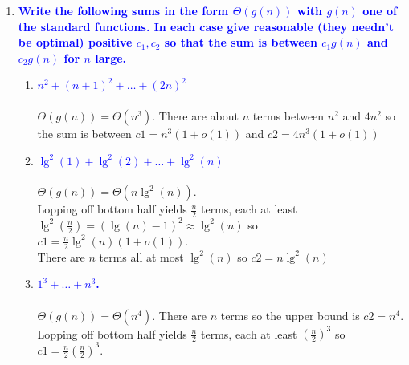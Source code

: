 \documentclass[11pt]{article}
\begin{document}
\begin{enumerate}
\item \textbf{\textcolor{blue}{Write the following sums in the form $\Theta(g(n))$ with $g(n)$
one of the standard functions.  
In each case give reasonable (they
needn't be optimal) positive $c_1,c_2$ so that the sum is between
$c_1g(n)$ and $c_2g(n)$ for $n$ large.}}
    \begin{enumerate}
    \item \textbf{\textcolor{blue}{$n^2+(n+1)^2+\ldots + (2n)^2$}}
        \\\\ $\Theta(g(n)) = \Theta(n^3)$. There are about $n$ terms between $n^2$ and $4n^2$ so the sum is between $c1 = n^3(1+o(1))$ and $c2 = 4n^3(1+o(1))$ \\
    \item \textbf{\textcolor{blue}{$\lg^2(1)+\lg^2(2)+\ldots + \lg^2(n)$}}
        \\\\ $\Theta(g(n)) = \Theta(n\lg^2(n))$.
        \\ Lopping off bottom half yields $\frac{n}{2}$ terms, each at least $\lg^2(\frac{n}{2}) = (\lg(n)-1)^2 \approx \lg^2(n)$ so $c1 = \frac{n}{2}\lg^2(n)(1 + o(1))$.
        \\ There are $n$ terms all at most $\lg^2(n)$ so $c2 = n\lg^2(n)$ \\
    \item \textbf{\textcolor{blue}{$1^3+\ldots+n^3$.}}
        \\\\ $\Theta(g(n)) = \Theta(n^4)$. There are $n$ terms so the upper bound is $c2=n^4$.
        \\ Lopping off bottom half yields $\frac{n}{2}$ terms, each at least $(\frac{n}{2})^3$ so $c1 = \frac{n}{2}(\frac{n}{2})^3$. \\
    \end{enumerate}



\end{enumerate}
\end{document}
